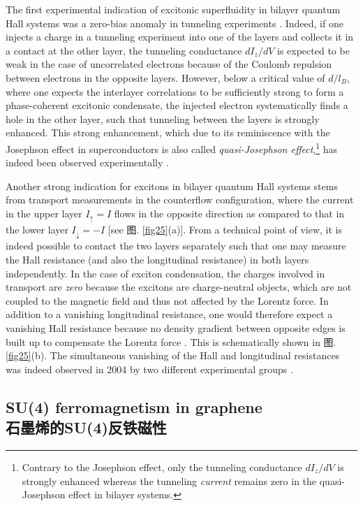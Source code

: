 \documentclass[10pt]{book}
\newcommand{\ua}{\uparrow}
\newcommand{\da}{\downarrow}
\begin{document}
The first experimental indication of excitonic superfluidity in bilayer quantum Hall systems was a zero-bias 
anomaly in tunneling experiments \cite{spielman}. Indeed, if one injects a charge in a tunneling experiment into one of
the layers and collects it in a contact at the other layer, the tunneling conductance $dI_z/dV$ is expected to be weak in the case
of uncorrelated electrons because of the Coulomb repulsion between electrons in the opposite layers.
However, below a critical value of $d/l_B$, where one
expects the interlayer correlations to be sufficiently strong to form a phase-coherent excitonic condensate, 
the injected electron systematically finds a hole in the other layer, 
such that tunneling between the layers is strongly enhanced. This strong enhancement, which due
to its reminiscence with the Josephson effect in superconductors \cite{tinkham} is also called 
{\sl quasi-Josephson effect},\footnote{Contrary to the Josephson effect, only the tunneling conductance $dI_z/dV$ is strongly
enhanced whereas the tunneling {\sl current} remains zero in the quasi-Josephson effect in bilayer systems.}
has indeed been observed experimentally \cite{spielman}.

Another strong indication for excitons in bilayer quantum Hall systems stems from transport measurements in the
counterflow configuration, where the current in the upper layer $I_{\ua}=I$ flows in the opposite direction as compared to
that in the lower layer $I_{\da}=-I$ [see 图. \ref{fig25}(a)]. From a technical point of view, it is indeed
possible to contact the two layers separately such that one may measure the Hall resistance (and also the longitudinal
resistance) in both layers independently. In the case of exciton condensation, the charges involved in transport are 
{\sl zero} because the excitons are charge-neutral objects, which are not coupled to the magnetic field and thus not
affected by the Lorentz force. In addition to a vanishing longitudinal resistance, one would therefore expect a vanishing
Hall resistance because no density gradient between opposite edges is built up to compensate the Lorentz force 
\cite{WZ,EI}. This is schematically shown in 图. \ref{fig25}(b). The simultaneous vanishing of the Hall and longitudinal
resistances was indeed observed in 2004 by two different experimental groups \cite{kellogg,tutuc}.


\subsection[石墨烯的SU(4)反铁磁性]{SU(4) ferromagnetism in graphene\\\bf 石墨烯的SU(4)反铁磁性}
\label{GraphFM}
\end{document}
